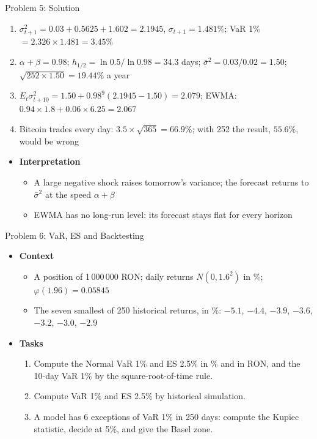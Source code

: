 \begin{frame}{Problem 5: Solution}
\itemsize{\footnotesize}
\begin{enumerate}
    \item $\sigma_{t+1}^2 = 0.03 + 0.5625 + 1.602 = 2.1945$, $\sigma_{t+1} = 1.481\%$; VaR 1\% $= 2.326 \times 1.481 = 3.45\%$
    \item $\alpha + \beta = 0.98$; $h_{1/2} = \ln 0.5/\ln 0.98 = 34.3$ days; $\bar\sigma^2 = 0.03/0.02 = 1.50$; $\sqrt{252 \times 1.50} = 19.44\%$ a year
    \item $E_t\sigma_{t+10}^2 = 1.50 + 0.98^9(2.1945 - 1.50) = 2.079$; EWMA: $0.94 \times 1.8 + 0.06 \times 6.25 = 2.067$
    \item Bitcoin trades every day: $3.5 \times \sqrt{365} = 66.9\%$; with 252 the result, $55.6\%$, would be wrong
\end{enumerate}
\begin{itemize}
    \item \textbf{Interpretation}
    \begin{itemize}
        \item A large negative shock raises tomorrow's variance; the forecast returns to $\bar\sigma^2$ at the speed $\alpha + \beta$
        \item EWMA has no long-run level: its forecast stays flat for every horizon
    \end{itemize}
\end{itemize}
\end{frame}

\begin{frame}{Problem 6: VaR, ES and Backtesting}
\itemsize{\footnotesize}
\begin{itemize}
    \item \textbf{Context}
    \begin{itemize}
        \item A position of 1\,000\,000 RON; daily returns $N(0, 1.6^2)$ in \%; $\varphi(1.96) = 0.05845$
        \item The seven smallest of 250 historical returns, in \%: $-5.1$, $-4.4$, $-3.9$, $-3.6$, $-3.2$, $-3.0$, $-2.9$
    \end{itemize}
    \item \textbf{Tasks}
\begin{enumerate}
    \item Compute the Normal VaR 1\% and ES 2.5\% in \% and in RON, and the 10-day VaR 1\% by the square-root-of-time rule.
    \item Compute VaR 1\% and ES 2.5\% by historical simulation.
    \item A model has 6 exceptions of VaR 1\% in 250 days: compute the Kupiec statistic, decide at 5\%, and give the Basel zone.
\end{enumerate}
\end{itemize}
\end{frame}

